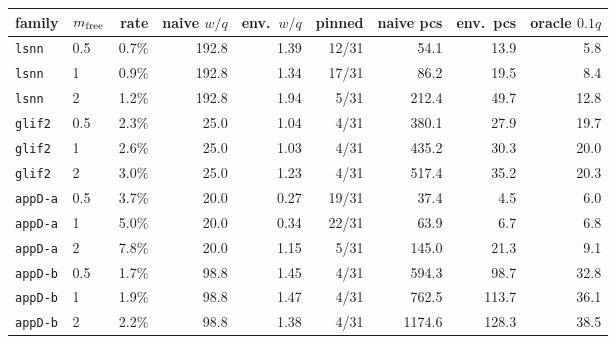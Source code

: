 \begin{tabular}{llrrrrrrr}
\toprule
family & $m_{\rm free}$ & rate & naive $w/q$ & env.\ $w/q$ & pinned & naive pcs & env.\ pcs & oracle $0.1q$\\
\midrule
\texttt{lsnn} & 0.5 & 0.7\% & 192.8 & 1.39 & 12/31 & 54.1 & 13.9 & 5.8\\
\texttt{lsnn} & 1 & 0.9\% & 192.8 & 1.34 & 17/31 & 86.2 & 19.5 & 8.4\\
\texttt{lsnn} & 2 & 1.2\% & 192.8 & 1.94 & 5/31 & 212.4 & 49.7 & 12.8\\
\texttt{glif2} & 0.5 & 2.3\% & 25.0 & 1.04 & 4/31 & 380.1 & 27.9 & 19.7\\
\texttt{glif2} & 1 & 2.6\% & 25.0 & 1.03 & 4/31 & 435.2 & 30.3 & 20.0\\
\texttt{glif2} & 2 & 3.0\% & 25.0 & 1.23 & 4/31 & 517.4 & 35.2 & 20.3\\
\texttt{appD-a} & 0.5 & 3.7\% & 20.0 & 0.27 & 19/31 & 37.4 & 4.5 & 6.0\\
\texttt{appD-a} & 1 & 5.0\% & 20.0 & 0.34 & 22/31 & 63.9 & 6.7 & 6.8\\
\texttt{appD-a} & 2 & 7.8\% & 20.0 & 1.15 & 5/31 & 145.0 & 21.3 & 9.1\\
\texttt{appD-b} & 0.5 & 1.7\% & 98.8 & 1.45 & 4/31 & 594.3 & 98.7 & 32.8\\
\texttt{appD-b} & 1 & 1.9\% & 98.8 & 1.47 & 4/31 & 762.5 & 113.7 & 36.1\\
\texttt{appD-b} & 2 & 2.2\% & 98.8 & 1.38 & 4/31 & 1174.6 & 128.3 & 38.5\\
\bottomrule
\end{tabular}
